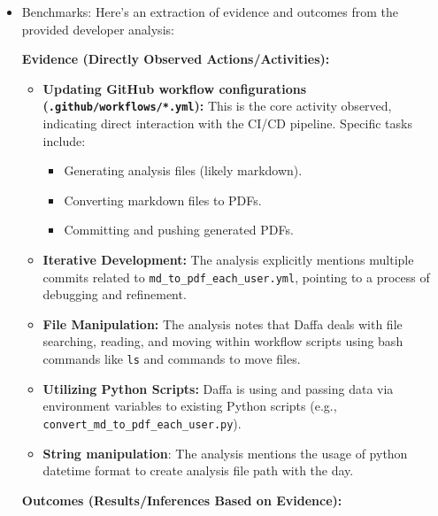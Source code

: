 \documentclass{article}
\begin{document}
\begin{itemize}
\begin{itemize}
        \item Benchmarks: Here's an extraction of evidence and outcomes from the provided developer analysis:

        \textbf{Evidence (Directly Observed Actions/Activities):}

        \begin{itemize}
            \item \textbf{Updating GitHub workflow configurations (\texttt{.github/workflows/*.yml}):} This is the core activity observed, indicating direct interaction with the CI/CD pipeline.  Specific tasks include:
            \begin{itemize}
                \item Generating analysis files (likely markdown).
                \item Converting markdown files to PDFs.
                \item Committing and pushing generated PDFs.
            \end{itemize}
            \item \textbf{Iterative Development:} The analysis explicitly mentions multiple commits related to \texttt{md\_to\_pdf\_each\_user.yml}, pointing to a process of debugging and refinement.
            \item \textbf{File Manipulation:}  The analysis notes that Daffa deals with file searching, reading, and moving within workflow scripts using bash commands like \texttt{ls} and commands to move files.
            \item \textbf{Utilizing Python Scripts:} Daffa is using and passing data via environment variables to existing Python scripts (e.g., \texttt{convert\_md\_to\_pdf\_each\_user.py}).
            \item \textbf{String manipulation}: The analysis mentions the usage of python datetime format to create analysis file path with the day.
        \end{itemize}

        \textbf{Outcomes (Results/Inferences Based on Evidence):}


\end{itemize}
\end{itemize}
\end{document}
